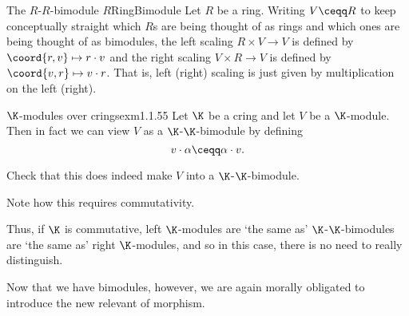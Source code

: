 \begin{exm}{The $R$-$R$-bimodule $R$}{RingBimodule}
	Let $R$ be a ring.  Writing $V\ceqq R$ to keep conceptually straight which $R$s are being thought of as rings and which ones are being thought of as bimodules, the left scaling $R\times V\rightarrow V$ is defined by $\coord{r,v}\mapsto r\cdot v$ and the right scaling $V\times R\rightarrow V$ is defined by $\coord{v,r}\mapsto v\cdot r$.  That is, left (right) scaling is just given by multiplication on the left (right).
\end{exm}
\begin{exm}{$\K$-modules over crings}{exm1.1.55}
	Let $\K$ be a cring and let $V$ be a $\K$-module.  Then in fact we can view $V$ as a $\K$-$\K$-bimodule by defining
	\begin{equation}
	v\cdot \alpha \ceqq \alpha \cdot v.
	\end{equation}
	\begin{exr}[breakable=false]{}{}
		Check that this does indeed make $V$ into a $\K$-$\K$-bimodule.
		\begin{rmk}
			Note how this requires commutativity.
		\end{rmk}
	\end{exr}
	Thus, if $\K$ is commutative, left $\K$-modules are `the same as' $\K$-$\K$-bimodules are `the same as' right $\K$-modules, and so in this case, there is no need to really distinguish.
\end{exm}
Now that we have bimodules, however, we are again morally obligated to introduce the new relevant of morphism.
